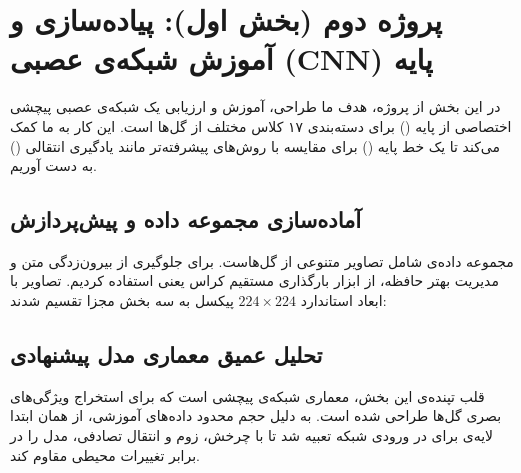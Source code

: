 \section{پروژه دوم (بخش اول): پیاده‌سازی و آموزش شبکه‌ی عصبی (CNN) پایه}

در این بخش از پروژه، هدف ما طراحی، آموزش و ارزیابی یک شبکه‌ی عصبی پیچشی اختصاصی از پایه () برای دسته‌بندی ۱۷ کلاس مختلف از گل‌ها است. این کار به ما کمک می‌کند تا یک خط پایه () برای مقایسه با روش‌های پیشرفته‌تر مانند یادگیری انتقالی () به دست آوریم.

\vspace{0.4cm}
\subsection{آماده‌سازی مجموعه داده و پیش‌پردازش}

مجموعه داده‌ی  شامل تصاویر متنوعی از گل‌هاست. برای جلوگیری از بیرون‌زدگی متن و مدیریت بهتر حافظه، از ابزار بارگذاری مستقیم کراس یعنی
استفاده کردیم. تصاویر با ابعاد استاندارد $224 \times 224$ پیکسل به سه بخش مجزا تقسیم شدند:

\begin{stepbox}
\end{stepbox}

\vspace{0.4cm}
\subsection{تحلیل عمیق معماری مدل پیشنهادی}

قلب تپنده‌ی این بخش، معماری شبکه‌ی پیچشی است که برای استخراج ویژگی‌های بصری گل‌ها طراحی شده است. به دلیل حجم محدود داده‌های آموزشی، از همان ابتدا لایه‌ی  برای  در ورودی شبکه تعبیه شد تا با چرخش، زوم و انتقال تصادفی، مدل را در برابر تغییرات محیطی مقاوم کند.

